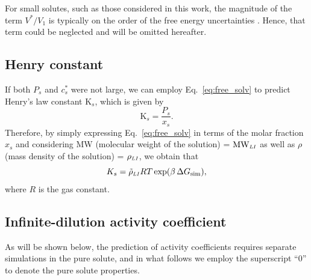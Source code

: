 \documentclass[3p,twocolumn]{elsarticle}
\begin{document}
For small solutes, such as those considered in this work, the magnitude of the term $V^{\ast}/V_1$ is typically on the order of the free energy uncertainties \cite{Shirts_2003}. Hence, that term could be neglected and will be omitted hereafter.

\subsection*{Henry constant}
If both $P_s$ and $c_s^{\ast}$ were not large, we can employ Eq.~\ref{eq:free_solv} to predict Henry's law constant $\text{K}_s$, which is given by \cite{Prausnitz}
\begin{equation}
\text{K}_s =\frac{P_s}{x_s}.
\end{equation}
Therefore, by simply expressing Eq.~\ref{eq:free_solv} in terms of the molar fraction $x_s$ and considering MW (molecular weight of the solution) = $\text{MW}_{\scaleto{LI}{4pt}}$ as well as $\rho$ (mass density of the solution) = $\rho_{\scaleto{LI}{4pt}}$, we obtain that
\begin{equation}
\label{eq:henry_eq}
K_s = \tilde{\rho}_{\scaleto{LI}{4pt}} R T \exp(\beta \, \Delta G_{\text{sim}}),
\end{equation}
where $R$ is the gas constant.

\subsection*{Infinite-dilution activity coefficient}

As will be shown below, the prediction of activity coefficients requires separate simulations in the pure solute, and in what follows we employ the superscript ``$0$'' to denote the pure solute properties.
\end{document}
